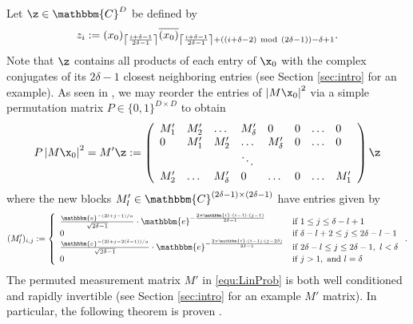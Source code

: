 Let $\z \in \mathbbm{C}^{D}$ be defined by 
%
\begin{equation}
    z_{i} :=  (x_0)_{\left \lceil \frac{i+\delta-1}{2\delta-1} 
            \right \rceil} \overline{(x_0)}_{\left \lceil 
            \frac{i+\delta-1}{2\delta-1} \right \rceil + 
            ((i+\delta-2)~{\rm mod}~(2\delta-1)) - \delta+1}.
    \label{equ:Defz}
\end{equation}
%
Note that $\z$ contains all products of each entry of $\x_0$ with the
complex conjugates of its ${2\delta -1}$ closest neighboring entries
(see Section \ref{sec:intro} for an example).  As seen in
\cite{IVW2015_FastPhase}, we may reorder the entries of $\left |  M \x_0
\right|^2$ via a simple permutation matrix $P \in \{ 0,1 \}^{D \times
D}$ to obtain
%
\begin{equation}
    P \left |  M \x_0 \right|^2 = M' \z := 
        \left( \begin{array}{llllllll}  
            M'_1& M'_2 & \hdots & M'_{\delta} & 0 & 0 & \hdots & 0\\
            0 & M'_1& M'_2 & \hdots & M'_{\delta} & 0 & \hdots & 0\\ 
            & &  & \ddots &  &  &  & \\
            M'_2  & \hdots & M'_{\delta} & 0 & \hdots & 0 & \hdots & M'_1  
        \end{array} \right) \z
    \label{equ:LinProb}
\end{equation}
%
where the new blocks $M'_{l} \in \mathbbm{C}^{(2\delta - 1) \times
(2\delta - 1)}$ have entries given by
%
\begin{equation*}
(M'_l)_{i,j} := \left\{ \begin{array}{ll} \frac{\mathbbm{e}^{-(2l+j-1)/ a}}{\sqrt{2\delta - 1}} \cdot \mathbbm{e}^{-\frac{2 \pi \mathbbm{i} \cdot (i - 1) \cdot (j-1)}{2\delta - 1}} & \textrm{if}~ 1 \leq j \leq \delta - l +1 \\
 0 & \textrm{if}~ \delta - l + 2 \leq j \leq 2\delta - l -1 \\  \frac{\mathbbm{e}^{-(2l+j-2(\delta - 1))/a}}{\sqrt{2\delta - 1}} \cdot \mathbbm{e}^{-\frac{2 \pi \mathbbm{i} \cdot (i - 1) \cdot (j - 2 \delta)}{2\delta - 1}}  & \textrm{if}~2 \delta - l \leq j \leq 2\delta - 1, ~l < \delta \\
  0 & \textrm{if}~ j > 1, ~\textrm{and}~ l = \delta  \end{array} \right..
\end{equation*} 
%
The permuted measurement matrix $M'$ in \eqref{equ:LinProb} is both well
conditioned and rapidly invertible (see Section \ref{sec:intro}  
for an example $M'$ matrix).  In particular, the following theorem is
proven \cite{IVW2015_FastPhase}.

